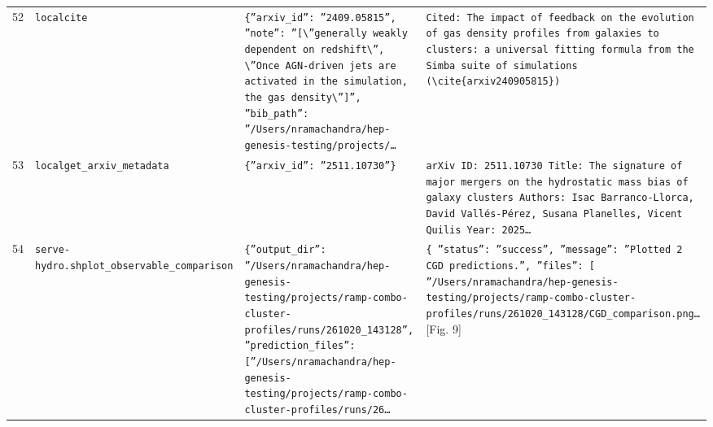\documentclass[11pt,a4paper]{article}
\begin{document}
\begin{longtable}{@{}p{}p{}p{}p{}@{}}
52 & \texttt{local}\newline\texttt{cite} & \texttt{\{''arxiv\_\allowbreak{}id'':\allowbreak{} ''2409.05815'',\allowbreak{} ''note'':\allowbreak{} ''[\textbackslash{}\allowbreak{}''generally weakly dependent on redshift\textbackslash{}\allowbreak{}'',\allowbreak{} \textbackslash{}\allowbreak{}''Once AGN-driven jets are activated in the simulation,\allowbreak{} the gas density\textbackslash{}\allowbreak{}'']\allowbreak{}'',\allowbreak{} ''bib\_\allowbreak{}path'':\allowbreak{} ''/\allowbreak{}Users/\allowbreak{}nramachandra/\allowbreak{}hep-genesis-testing/\allowbreak{}projects/\allowbreak{}\ldots{}\allowbreak{}} & \texttt{Cited:\allowbreak{} The impact of feedback on the evolution of gas density profiles from galaxies to clusters:\allowbreak{} a universal fitting formula from the Simba suite of simulations (\textbackslash{}\allowbreak{}cite\{arxiv240905815\}\allowbreak{})\allowbreak{}} \\
53 & \texttt{local}\newline\texttt{get\_\allowbreak{}arxiv\_\allowbreak{}metadata} & \texttt{\{''arxiv\_\allowbreak{}id'':\allowbreak{} ''2511.10730''\}\allowbreak{}} & \texttt{arXiv ID:\allowbreak{} 2511.10730 Title:\allowbreak{} The signature of major mergers on the hydrostatic mass bias of galaxy clusters Authors:\allowbreak{} Isac Barranco-Llorca,\allowbreak{} David Vallés-Pérez,\allowbreak{} Susana Planelles,\allowbreak{} Vicent Quilis Year:\allowbreak{} 2025\ldots{}\allowbreak{}} \\
54 & \texttt{serve-hydro.sh}\newline\texttt{plot\_\allowbreak{}observable\_\allowbreak{}comparison} & \texttt{\{''output\_\allowbreak{}dir'':\allowbreak{} ''/\allowbreak{}Users/\allowbreak{}nramachandra/\allowbreak{}hep-genesis-testing/\allowbreak{}projects/\allowbreak{}ramp-combo-cluster-profiles/\allowbreak{}runs/\allowbreak{}261020\_\allowbreak{}143128'',\allowbreak{} ''prediction\_\allowbreak{}files'':\allowbreak{} [''/\allowbreak{}Users/\allowbreak{}nramachandra/\allowbreak{}hep-genesis-testing/\allowbreak{}projects/\allowbreak{}ramp-combo-cluster-profiles/\allowbreak{}runs/\allowbreak{}26\ldots{}\allowbreak{}} & \texttt{\{   ''status'':\allowbreak{} ''success'',\allowbreak{}   ''message'':\allowbreak{} ''Plotted 2 CGD predictions.'',\allowbreak{}   ''files'':\allowbreak{} [     ''/\allowbreak{}Users/\allowbreak{}nramachandra/\allowbreak{}hep-genesis-testing/\allowbreak{}projects/\allowbreak{}ramp-combo-cluster-profiles/\allowbreak{}runs/\allowbreak{}261020\_\allowbreak{}143128/\allowbreak{}CGD\_\allowbreak{}comparison.png\ldots{}\allowbreak{}} [Fig. 9] \\

\end{longtable}
\end{document}
